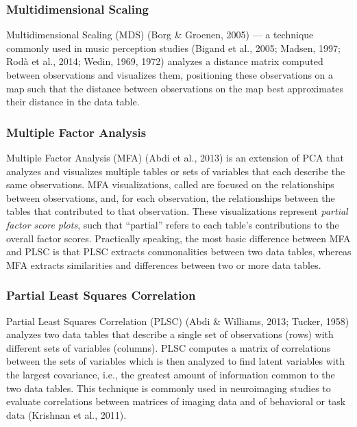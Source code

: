 \documentclass[
  english,
  man,floatsintext]{apa6}
\begin{document}
\hypertarget{multidimensional-scaling}{%
\subsubsection{Multidimensional Scaling}\label{multidimensional-scaling}}

Multidimensional Scaling (MDS) (Borg \& Groenen, 2005) --- a technique commonly used in music perception studies (Bigand et al., 2005; Madsen, 1997; Rodà et al., 2014; Wedin, 1969, 1972) analyzes a distance matrix computed between observations and visualizes them, positioning these observations on a map such that the distance between observations on the map best approximates their distance in the data table.

\hypertarget{multiple-factor-analysis}{%
\subsubsection{Multiple Factor Analysis}\label{multiple-factor-analysis}}

Multiple Factor Analysis (MFA) (Abdi et al., 2013) is an extension of PCA that analyzes and visualizes multiple tables or sets of variables that each describe the same observations. MFA visualizations, called are focused on the relationships between observations, and, for each observation, the relationships between the tables that contributed to that observation. These visualizations represent \emph{partial factor score plots}, such that ``partial'' refers to each table's contributions to the overall factor scores. Practically speaking, the most basic difference between MFA and PLSC is that PLSC extracts commonalities between two data tables, whereas MFA extracts similarities and differences between two or more data tables.

\hypertarget{partial-least-squares-correlation}{%
\subsubsection{Partial Least Squares Correlation}\label{partial-least-squares-correlation}}

Partial Least Squares Correlation (PLSC) (Abdi \& Williams, 2013; Tucker, 1958) analyzes two data tables that describe a single set of observations (rows) with different sets of variables (columns). PLSC computes a matrix of correlations between the sets of variables which is then analyzed to find latent variables with the largest covariance, i.e., the greatest amount of information common to the two data tables. This technique is commonly used in neuroimaging studies to evaluate correlations between matrices of imaging data and of behavioral or task data (Krishnan et al., 2011).
\end{document}
